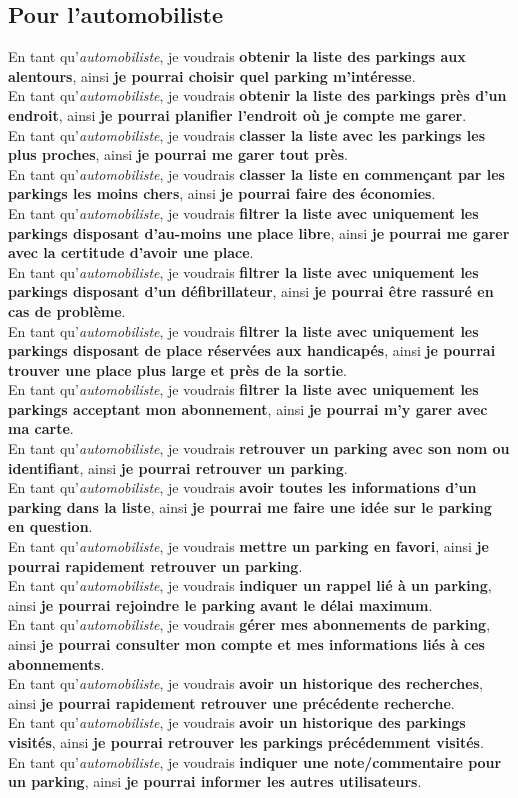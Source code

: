 \documentclass[a4paper,11pt]{article}
\newcommand{\userstory}[3]{En tant #1, je voudrais \textbf{#2}, ainsi \textbf{#3}.\\}
\newcommand{\etauto}[2]{\userstory{qu'\textit{automobiliste}}{#1}{#2}}
\begin{document}
\subsection{Pour l'automobiliste}
  \noindent
  \etauto{obtenir la liste des parkings aux alentours}{je pourrai choisir quel parking m'intéresse}
  \etauto{obtenir la liste des parkings près d'un endroit}{je pourrai planifier l'endroit où je compte me garer}
  \etauto{classer la liste avec les parkings les plus proches}{je pourrai me garer tout près}
  \etauto{classer la liste en commençant par les parkings les moins chers}{je pourrai faire des économies}
  \etauto{filtrer la liste avec uniquement les parkings disposant d'au-moins une place libre}{je pourrai me garer avec la certitude d'avoir une place}
  \etauto{filtrer la liste avec uniquement les parkings disposant d'un défibrillateur}{je pourrai être rassuré en cas de problème}
  \etauto{filtrer la liste avec uniquement les parkings disposant de place réservées aux handicapés}{je pourrai trouver une place plus large et près de la sortie} %
  \etauto{filtrer la liste avec uniquement les parkings acceptant mon abonnement}{je pourrai m'y garer avec ma carte}
  \etauto{retrouver un parking avec son nom ou identifiant}{je pourrai retrouver un parking}
  \etauto{avoir toutes les informations d'un parking dans la liste}{je pourrai me faire une idée sur le parking en question}
  \etauto{mettre un parking en favori}{je pourrai rapidement retrouver un parking}
  \etauto{indiquer un rappel lié à un parking}{je pourrai rejoindre le parking avant le délai maximum}
  \etauto{gérer mes abonnements de parking}{je pourrai consulter mon compte et mes informations liés à ces abonnements}
  \etauto{avoir un historique des recherches}{je pourrai rapidement retrouver une précédente recherche}
  \etauto{avoir un historique des parkings visités}{je pourrai retrouver les parkings précédemment visités}
  \etauto{indiquer une note/commentaire pour un parking}{je pourrai informer les autres utilisateurs}
\end{document}
